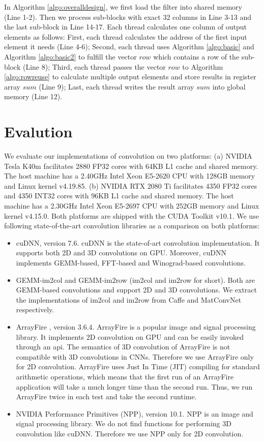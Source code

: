 \documentclass[sigplan,review,anonymous]{acmart}\settopmatter{printfolios=true,printccs=false,printacmref=false}
\begin{document}
In Algorithm \ref{algo:overalldesign}, we first load the filter into shared memory (Line 1-2). Then we process sub-blocks with exact 32 columns in Line 3-13 and the last sub-block in Line 14-17. Each thread calculates one column of output elements as follows: First, each thread calculates the address of the first input element it needs (Line 4-6); Second, each thread uses Algorithm \ref{algo:basic} and Algorithm \ref{algo:basic2} to fulfill the vector $row$ which contains a row of the sub-block (Line 8); Third, each thread passes the vector $row$ to Algorithm \ref{algo:rowreuse} to calculate multiple output elements and store results in register array $sum$ (Line 9); Last, each thread writes the result array $sum$ into global memory (Line 12).

\section{Evalution}
We evaluate our implementations of convolution on two platforms: (a) NVIDIA Tesla K40m facilitates 2880 FP32 cores with 64KB L1 cache and shared memory. The host machine has a 2.40GHz Intel Xeon E5-2620 CPU with 128GB memory and Linux kernel v4.19.85. (b) NVIDIA RTX 2080 Ti facilitates 4350 FP32 cores and 4350 INT32 cores with 96KB L1 cache and shared memory. The host machine has a 2.30GHz Intel Xeon E5-2697 CPU with 252GB memory and Linux kernel v4.15.0. Both platforms are shipped with the CUDA Toolkit v10.1. We use following state-of-the-art convolution libraries as a comparison on both platforms:
\begin{itemize}
  \item cuDNN, version 7.6. cuDNN is the state-of-art convolution implementation. It supports both 2D and 3D convolutions on GPU. Moreover, cuDNN implements GEMM-based, FFT-based and Winograd-based convolutions.
  \item GEMM-im2col and GEMM-im2row (im2col and im2row for short). Both are GEMM-based convolutions and support 2D and 3D convolutions. We extract the implementations of im2col and im2row from Caffe \cite{jia2014caffe} and MatConvNet \cite{vedaldi15matconvnet} respectively.
  \item ArrayFire \cite{Yalamanchili2015}, version 3.6.4. ArrayFire is a popular image and signal processing library. It implements 2D convolution on GPU and can be easily invoked through an api. The semantics of 3D convolution of ArrayFire is not compatible with 3D convolutions in CNNs. Therefore we use ArrayFire only for 2D convolution. ArrayFire uses Just In Time (JIT) compiling for standard arithmetic operations, which means that the first run of an ArrayFire application will take a much longer time than the second run. Thus, we run ArrayFire twice in each test and take the second runtime.
  \item NVIDIA Performance Primitives (NPP), version 10.1. NPP is an image and signal processing library. We do not find functions for performing 3D convolution like cuDNN. Therefore we use NPP only for 2D convolution.

\end{itemize}
\end{document}

